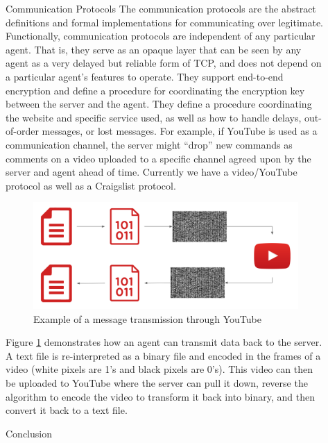 \documentclass[final]{beamer}
\newlength{\sepwidth}
\newlength{\colwidth}
\newcommand{\separatorcolumn}{\begin{column}{\sepwidth}\end{column}}
\begin{document}
\begin{frame}[t]
\begin{columns}[t]
\begin{column}{\colwidth}
\begin{block}{}
  \end{block}

\end{column}

\separatorcolumn

\begin{column}{\colwidth}

  \begin{block}{Communication Protocols}
    The communication protocols are the abstract definitions and formal implementations for communicating over legitimate. Functionally, communication protocols are independent of any particular agent.
    That is, they serve as an opaque layer that can be seen by any agent as a very delayed but reliable form of TCP, and does not depend on a particular agent’s features to operate.
    They support end-to-end encryption and define a procedure for coordinating the encryption key between the server and the agent.
    They define a procedure coordinating the website and specific service used, as well as how to handle delays, out-of-order messages, or lost messages. For example, if YouTube is used as a communication channel, the server might “drop” new commands as comments on a video uploaded to a specific channel agreed upon by the server and agent ahead of time.
    Currently we have a video/YouTube protocol as well as a Craigslist protocol.

    \begin{figure}
      \centering
      \includegraphics[width=\textwidth]{images/encode.png}
      \caption{\quad Example of a message transmission through YouTube}
      \label{fig:encode}
    \end{figure}
    Figure \ref{fig:encode} demonstrates how an agent can transmit data back to the server. 
    A text file is re-interpreted as a binary file and encoded in the frames of a video (white pixels are 1's and black pixels are 0's). 
    This video can then be uploaded to YouTube where the server can pull it down, reverse the algorithm to encode the video to transform it back into binary, and then convert it back to a text file.
  \end{block}
  \begin{block}{Conclusion}


\end{block}
\end{column}
\end{columns}
\end{frame}
\end{document}
